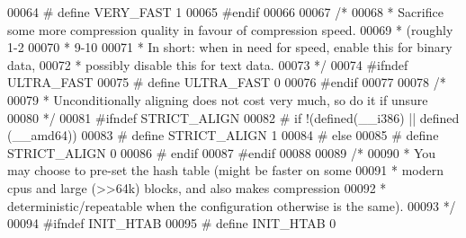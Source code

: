 \begin{DoxyCode}
{00064 \textcolor{preprocessor}{#} \textcolor{preprocessor}{define} \textcolor{preprocessor}{VERY\_FAST} 1
00065 \textcolor{preprocessor}{#}\textcolor{preprocessor}{endif}
00066 
00067 \textcolor{comment}{/*}
00068 \textcolor{comment}{ * Sacrifice some more compression quality in favour of compression speed.}
00069 \textcolor{comment}{ * (roughly 1-2%
00070 \textcolor{comment}{ * 9-10%
00071 \textcolor{comment}{ * In short: when in need for speed, enable this for binary data,}
00072 \textcolor{comment}{ * possibly disable this for text data.}
00073 \textcolor{comment}{ */}
00074 \textcolor{preprocessor}{#}\textcolor{preprocessor}{ifndef} \textcolor{preprocessor}{ULTRA\_FAST}
00075 \textcolor{preprocessor}{#} \textcolor{preprocessor}{define} \textcolor{preprocessor}{ULTRA\_FAST} 0
00076 \textcolor{preprocessor}{#}\textcolor{preprocessor}{endif}
00077 
00078 \textcolor{comment}{/*}
00079 \textcolor{comment}{ * Unconditionally aligning does not cost very much, so do it if unsure}
00080 \textcolor{comment}{ */}
00081 \textcolor{preprocessor}{#}\textcolor{preprocessor}{ifndef} \textcolor{preprocessor}{STRICT\_ALIGN}
00082 \textcolor{preprocessor}{#} \textcolor{preprocessor}{if} \textcolor{preprocessor}{!}\textcolor{preprocessor}{(}\textcolor{preprocessor}{defined}\textcolor{preprocessor}{(}\textcolor{preprocessor}{\_\_i386}\textcolor{preprocessor}{)} \textcolor{preprocessor}{||} \textcolor{preprocessor}{defined} \textcolor{preprocessor}{(}\_\_amd64\textcolor{preprocessor}{)}\textcolor{preprocessor}{)}
00083 \textcolor{preprocessor}{#}  \textcolor{preprocessor}{define} \textcolor{preprocessor}{STRICT\_ALIGN} 1
00084 \textcolor{preprocessor}{#} \textcolor{preprocessor}{else}
00085 \textcolor{preprocessor}{#}  \textcolor{preprocessor}{define} \textcolor{preprocessor}{STRICT\_ALIGN} 0
00086 \textcolor{preprocessor}{#} \textcolor{preprocessor}{endif}
00087 \textcolor{preprocessor}{#}\textcolor{preprocessor}{endif}
00088 
00089 \textcolor{comment}{/*}
00090 \textcolor{comment}{ * You may choose to pre-set the hash table (might be faster on some}
00091 \textcolor{comment}{ * modern cpus and large (>>64k) blocks, and also makes compression}
00092 \textcolor{comment}{ * deterministic/repeatable when the configuration otherwise is the same).}
00093 \textcolor{comment}{ */}
00094 \textcolor{preprocessor}{#}\textcolor{preprocessor}{ifndef} \textcolor{preprocessor}{INIT\_HTAB}
00095 \textcolor{preprocessor}{#} \textcolor{preprocessor}{define} \textcolor{preprocessor}{INIT\_HTAB} 0
}}}
\end{DoxyCode}
